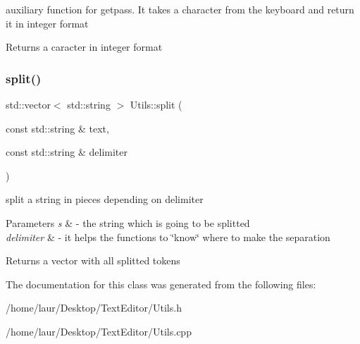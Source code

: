 auxiliary function for getpass. It takes a character from the keyboard and return it in integer format

\begin{DoxyReturn}{Returns}
a caracter in integer format 
\end{DoxyReturn}
\mbox{\label{class_utils_a04abf2d4f3728fc99c889075e767fd55}} 
\subsubsection{\texorpdfstring{split()}{split()}}
{\footnotesize\ttfamily std\+::vector$<$ std\+::string $>$ Utils\+::split (\begin{DoxyParamCaption}\item[{const std\+::string \&}]{text,  }\item[{const std\+::string \&}]{delimiter }\end{DoxyParamCaption})\hspace{0.3cm}{\ttfamily [static]}}

split a string in pieces depending on delimiter 
\begin{DoxyParams}{Parameters}
{\em s} & -\/ the string which is going to be splitted \\
\hline
{\em delimiter} & -\/ it helps the functions to \char`\"{}know\char`\"{} where to make the separation\\
\hline
\end{DoxyParams}
\begin{DoxyReturn}{Returns}
a vector with all splitted tokens 
\end{DoxyReturn}


The documentation for this class was generated from the following files\+:\begin{DoxyCompactItemize}
\item 
/home/laur/\+Desktop/\+Text\+Editor/Utils.\+h\item 
/home/laur/\+Desktop/\+Text\+Editor/Utils.\+cpp\end{DoxyCompactItemize}
